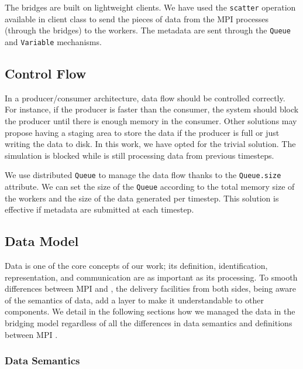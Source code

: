 The bridges are built on lightweight \dask clients. We have used the \texttt{scatter} operation available in \dask client class to send the pieces of data from the MPI processes (through the bridges) to the \dask workers. The metadata are sent through the \dask \texttt{Queue} and \texttt{Variable} mechanisms.

\subsection{Control Flow}\label{sec:dataflow}

In a producer/consumer architecture, data flow should be controlled correctly. For instance, if the producer is faster than the consumer, the system should block the producer until there is enough memory in the consumer. Other solutions may propose having a staging area to store the data if the producer is full or just writing the data to disk. 
In this work, we have opted for the trivial solution. The simulation is blocked while \dask is still processing data from previous timesteps.  

We use \dask distributed \texttt{Queue} to manage the data flow thanks to the \texttt{Queue.size} attribute. We can set the size of the \texttt{Queue} according to the total memory size of the workers and the size of the data generated per timestep. 
This solution is effective if metadata are submitted at each timestep. 

\subsection{Data Model}\label{sec:btpImp:datamodel}

Data is one of the core concepts of our work; its definition, identification, representation, and communication are as important as its processing. To smooth  differences between MPI and \dask, the delivery facilities from both sides, being aware of the semantics of data, add a layer to make it understandable to other components. 
We detail in the following sections how we managed the data in the \deisa bridging model regardless of all the differences in data semantics and definitions between MPI \dask. 

\subsubsection{Data Semantics}\label{sec:datasemantic}

